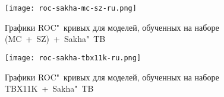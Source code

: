 \begin{figure}[ht]%
	\centering
	\texttt{[image: roc-sakha-mc-sz-ru.png]}
	\caption{Графики ROC"~кривых для моделей, обученных на наборе (MC~+~SZ)~+~Sakha"~TB}\label{fig-roc-mc-sz-sakha}
\end{figure}


\begin{figure}[ht]%
	\centering
	\texttt{[image: roc-sakha-tbx11k-ru.png]}
	\caption{Графики ROC"~кривых для моделей, обученных на наборе TBX11K~+~Sakha"~TB}\label{fig-roc-tbx11k-sakha}
\end{figure}





